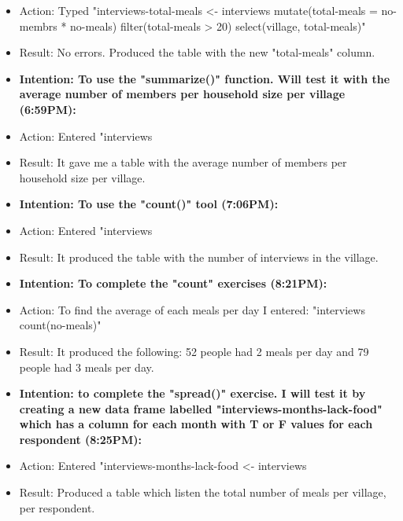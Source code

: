 \documentclass[a4paper,12pt]{article}
\begin{document}
\begin{itemize}
\item Action: Typed "interviews-total-meals <- interviews %
    mutate(total-meals = no-membrs * no-meals) %
    filter(total-meals > 20) %
    select(village, total-meals)"
    

\item Result: No errors. Produced the table with the new "total-meals" column. 


\item \textbf{Intention: To use the "summarize()" function. Will test it with the average number of members per household size per village (6:59PM):}


\item Action: Entered "interviews %


\item Result: It gave me a table with the average number of members per household size per village.


\item \textbf{Intention: To use the "count()" tool (7:06PM):}


\item Action: Entered "interviews %


\item Result: It produced the table with the number of interviews in the village. 


\item \textbf{Intention: To complete the "count" exercises (8:21PM):}


\item Action: To find the average of each meals per day I entered: "interviews %
   count(no-meals)"
    

\item Result: It produced the following: 52 people had 2 meals per day and 79 people had 3 meals per day. 


\item \textbf{Intention: to complete the "spread()" exercise. I will test it by creating a new data frame labelled "interviews-months-lack-food" which has a column for each month with T or F values for each respondent (8:25PM):}


\item Action: Entered "interviews-months-lack-food <- interviews %


\item Result: Produced a table which listen the total number of meals per village, per respondent. 


\end{itemize}
\end{document}
